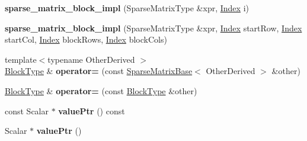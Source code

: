 \begin{DoxyCompactItemize}
{\bfseries sparse\+\_\+matrix\+\_\+block\+\_\+impl} (Sparse\+Matrix\+Type \&xpr, \hyperlink{group___core___module_a554f30542cc2316add4b1ea0a492ff02}{Index} i)
\item 
\mbox{\label{class_eigen_1_1internal_1_1sparse__matrix__block__impl_af1e7119b5d54afe75bf374e2e5600e32}} 
{\bfseries sparse\+\_\+matrix\+\_\+block\+\_\+impl} (Sparse\+Matrix\+Type \&xpr, \hyperlink{group___core___module_a554f30542cc2316add4b1ea0a492ff02}{Index} start\+Row, \hyperlink{group___core___module_a554f30542cc2316add4b1ea0a492ff02}{Index} start\+Col, \hyperlink{group___core___module_a554f30542cc2316add4b1ea0a492ff02}{Index} block\+Rows, \hyperlink{group___core___module_a554f30542cc2316add4b1ea0a492ff02}{Index} block\+Cols)
\item 
\mbox{\label{class_eigen_1_1internal_1_1sparse__matrix__block__impl_a1163a9d4638cbd5f950d413805842374}} 
{\footnotesize template$<$typename Other\+Derived $>$ }\\\hyperlink{group___core___module_class_eigen_1_1_block}{Block\+Type} \& {\bfseries operator=} (const \hyperlink{group___sparse_core___module_class_eigen_1_1_sparse_matrix_base}{Sparse\+Matrix\+Base}$<$ Other\+Derived $>$ \&other)
\item 
\mbox{\label{class_eigen_1_1internal_1_1sparse__matrix__block__impl_aae730b7511c6b56fad9cc6a118b43f35}} 
\hyperlink{group___core___module_class_eigen_1_1_block}{Block\+Type} \& {\bfseries operator=} (const \hyperlink{group___core___module_class_eigen_1_1_block}{Block\+Type} \&other)
\item 
\mbox{\label{class_eigen_1_1internal_1_1sparse__matrix__block__impl_abadc00922ce8ee648673eb7d11149d59}} 
const Scalar $\ast$ {\bfseries value\+Ptr} () const
\item 
\mbox{\label{class_eigen_1_1internal_1_1sparse__matrix__block__impl_acb2138832cabff4115a9f5e6ecfe12c9}} 
Scalar $\ast$ {\bfseries value\+Ptr} ()
\item 
\mbox{\label{class_eigen_1_1internal_1_1sparse__matrix__block__impl_a0746c7f2edb192473158ae76211fce88}} 

\end{DoxyCompactItemize}
